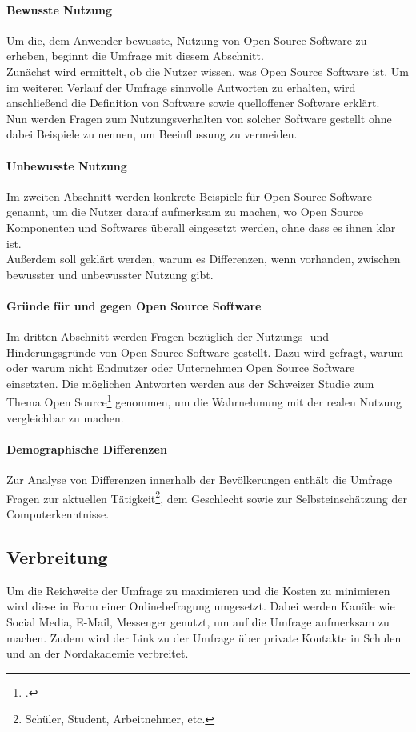 \documentclass[a4paper]{article}
\begin{document}
			\paragraph{Bewusste Nutzung}
				Um die, dem Anwender bewusste, Nutzung von Open Source Software zu erheben, beginnt die Umfrage mit diesem Abschnitt.\\
				Zunächst wird ermittelt, ob die Nutzer wissen, was Open Source Software ist. Um im weiteren Verlauf der Umfrage sinnvolle Antworten zu erhalten, wird anschließend die Definition von Software sowie quelloffener Software erklärt.\\
				Nun werden Fragen zum Nutzungsverhalten von solcher Software gestellt ohne dabei Beispiele zu nennen, um Beeinflussung zu vermeiden.
			
			\paragraph{Unbewusste Nutzung}
				Im zweiten Abschnitt werden konkrete Beispiele für Open Source Software genannt, um die Nutzer darauf aufmerksam zu machen, wo Open Source Komponenten und Softwares überall eingesetzt werden, ohne dass es ihnen klar ist.\\
				Außerdem soll geklärt werden, warum es Differenzen, wenn vorhanden, zwischen bewusster und unbewusster Nutzung gibt.
			
			\paragraph{Gründe für und gegen Open Source Software}
				Im dritten Abschnitt werden Fragen bezüglich der Nutzungs- und Hinderungsgründe von Open Source Software gestellt. Dazu wird gefragt, warum oder warum nicht Endnutzer oder Unternehmen Open Source Software einsetzten. Die möglichen Antworten werden aus der Schweizer Studie zum Thema Open Source\footcite{oss:studie} genommen, um die Wahrnehmung mit der realen Nutzung vergleichbar zu machen.
			
			\paragraph{Demographische Differenzen}
				Zur Analyse von Differenzen innerhalb der Bevölkerungen enthält die Umfrage Fragen zur aktuellen Tätigkeit\footnote{Schüler, Student, Arbeitnehmer, etc.}, dem Geschlecht sowie zur Selbsteinschätzung der Computerkenntnisse.
				
		\subsection{Verbreitung}
			Um die Reichweite der Umfrage zu maximieren und die Kosten zu minimieren wird diese in Form einer Onlinebefragung umgesetzt. Dabei werden Kanäle wie Social Media, E-Mail, Messenger genutzt, um auf die Umfrage aufmerksam zu machen. Zudem wird der Link zu der Umfrage über private Kontakte in Schulen und an der Nordakademie verbreitet.
     
\end{document}
